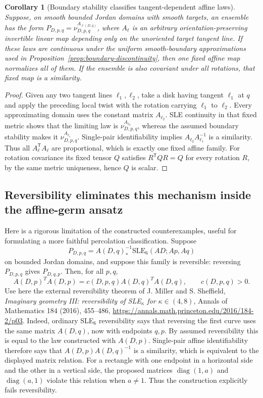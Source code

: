 \documentclass[11pt]{article}
\newtheorem{corollary}[theorem]{Corollary}
\theoremstyle{definition}\newtheorem{definition}[theorem]{Definition}
\theoremstyle{remark}\newtheorem{remark}[theorem]{Remark}
\newcommand{\nuA}[4]{\nu^{#1}_{#2,#3,#4}}
\begin{document}
\begin{corollary}[Boundary stability classifies tangent-dependent affine laws]
\label{cor:tangent-stability}
Suppose, on smooth bounded Jordan domains with smooth targets, an ensemble
has the form $P_{D,p,q}=\nuA{A_{\ell(D,q)}}{D}{p}{q}$, where $A_\ell$
is an arbitrary orientation-preserving invertible linear map depending
only on the unoriented target tangent line. If these laws are continuous
under the uniform smooth-boundary approximations used in
Proposition~\ref{prop:boundary-discontinuity}, then one fixed affine
map normalizes all of them. If the ensemble is also covariant under
all rotations, that fixed map is a similarity.
\end{corollary}
\begin{proof}
Given any two tangent lines $\ell_1,\ell_2$, take a disk having tangent
$\ell_1$ at $q$ and apply the preceding local twist with the rotation
carrying $\ell_1$ to $\ell_2$. Every approximating domain uses the
constant matrix $A_{\ell_2}$. SLE continuity in that fixed metric shows
that the limiting law is $\nuA{A_{\ell_2}}{D}{p}{q}$, whereas the assumed
boundary stability makes it $\nuA{A_{\ell_1}}{D}{p}{q}$. Single-pair
identifiability implies $A_{\ell_2}A_{\ell_1}^{-1}$ is a similarity.
Thus all $A_\ell^{\mathsf T}A_\ell$ are proportional, which is exactly
one fixed affine family. For rotation covariance its fixed tensor $Q$
satisfies $R^{\mathsf T}QR=Q$ for every rotation $R$, by the same metric
uniqueness, hence $Q$ is scalar.
\end{proof}

\subsection{Reversibility eliminates this mechanism inside the affine-germ ansatz}

Here is a rigorous limitation of the constructed counterexamples, useful for
formulating a more faithful percolation classification.  Suppose
\[
 P_{D,p,q}=A(D,q)^{-1}_*\mathrm{SLE}_6(AD;Ap,Aq)
\]
on bounded Jordan domains, and suppose this family is reversible:
reversing $P_{D,p,q}$ gives $P_{D,q,p}$.  Then, for all $p,q$,
\[
 A(D,p)^T A(D,p)=c(D,p,q)A(D,q)^T A(D,q),\qquad c(D,p,q)>0.
\]
Use here the external reversibility theorem of J. Miller and S. Sheffield,
\emph{Imaginary geometry III: reversibility of SLE$_\kappa$ for
$\kappa\in(4,8)$}, Annals of Mathematics 184 (2016), 455--486,
\url{https://annals.math.princeton.edu/2016/184-2/p03}.
Indeed, ordinary SLE$_6$ reversibility says that reversing the first curve
uses the same matrix $A(D,q)$, now with endpoints $q,p$.  By assumed
reversibility this is equal to the law constructed with $A(D,p)$.
Single-pair affine identifiability therefore says that
$A(D,p)A(D,q)^{-1}$ is a similarity, which is equivalent to the displayed
matrix relation.  For a rectangle with one endpoint in a horizontal side
and the other in a vertical side, the proposed matrices
$\operatorname{diag}(1,a)$ and $\operatorname{diag}(a,1)$ violate this relation
when $a\ne1$.  Thus the construction explicitly fails reversibility.
\end{document}
